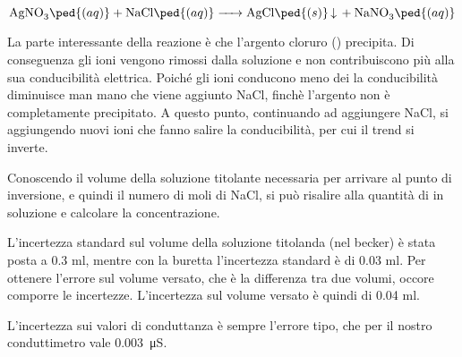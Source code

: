 \begin{equation*}
        \ce{AgNO3\ped{(aq)} + NaCl\ped{(aq)} -> AgCl\ped{(s)} v + NaNO3\ped{(aq)}}
\end{equation*}

La parte interessante della reazione è che l'argento cloruro () precipita. Di conseguenza gli ioni 
vengono rimossi dalla soluzione e non contribuiscono più alla sua conducibilità elettrica.
Poiché gli ioni  conducono meno dei  la conducibilità diminuisce man mano che viene aggiunto NaCl,
finchè l'argento non è completamente precipitato. A questo punto, continuando ad aggiungere NaCl, si aggiungendo nuovi ioni  che fanno salire la conducibilità,
per cui il trend si inverte.

Conoscendo il volume della soluzione titolante necessaria per arrivare al punto di inversione, e quindi il numero di moli
di NaCl, si può risalire alla quantità di  in soluzione e calcolare la concentrazione.

L'incertezza standard sul volume della soluzione titolanda (nel becker) è stata posta a 0.3 ml, mentre con la
buretta l'incertezza standard è di 0.03 ml. Per ottenere l'errore sul volume versato, che è la differenza tra due volumi,
occore comporre le incertezze. L'incertezza sul volume versato è quindi di 0.04 ml.

L'incertezza sui valori di conduttanza è sempre l'errore tipo, che per il nostro conduttimetro vale \SI{0.003}{\micro\siemens}.
